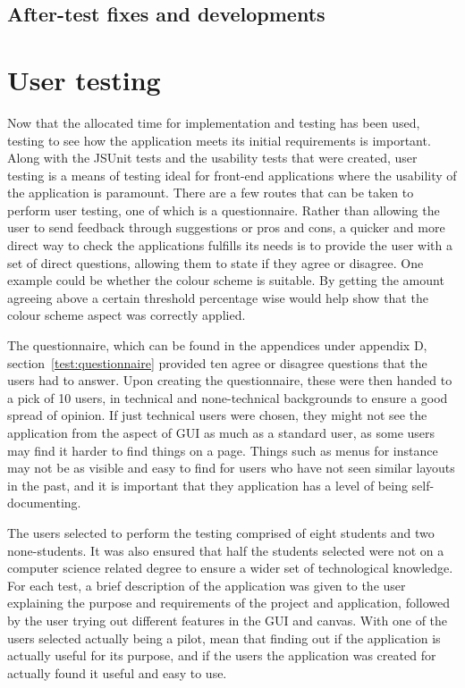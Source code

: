 \subsection{After-test fixes and developments}


\section{User testing}
Now that the allocated time for implementation and testing has been used, testing to see how the application meets its initial requirements is important. Along with the JSUnit tests and the usability tests that were created, user testing is a means of testing ideal for front-end applications where the usability of the application is paramount. There are a few routes that can be taken to perform user testing, one of which is a questionnaire. Rather than allowing the user to send feedback through suggestions or pros and cons, a quicker and more direct way to check the applications fulfills its needs is to provide the user with a set of direct questions, allowing them to state if they agree or disagree. One example could be whether the colour scheme is suitable. By getting the amount agreeing above a certain threshold percentage wise would help show that the colour scheme aspect was correctly applied.

The questionnaire, which can be found in the appendices under appendix D, section~\ref{test:questionnaire} provided ten agree or disagree questions that the users had to answer. Upon creating the questionnaire, these were then handed to a pick of 10 users, in technical and none-technical backgrounds to ensure a good spread of opinion. If just technical users were chosen, they might not see the application from the aspect of GUI as much as a standard user, as some users may find it harder to find things on a page. Things such as menus for instance may not be as visible and easy to find for users who have not seen similar layouts in the past, and it is important that they application has a level of being self-documenting.

The users selected to perform the testing comprised of eight students and two none-students. It was also ensured that half the students selected were not on a computer science related degree to ensure a wider set of technological knowledge. For each test, a brief description of the application was given to the user explaining the purpose and requirements of the project and application, followed by the user trying out different features in the GUI and canvas. With one of the users selected actually being a pilot, mean that finding out if the application is actually useful for its purpose, and if the users the application was created for actually found it useful and easy to use.

